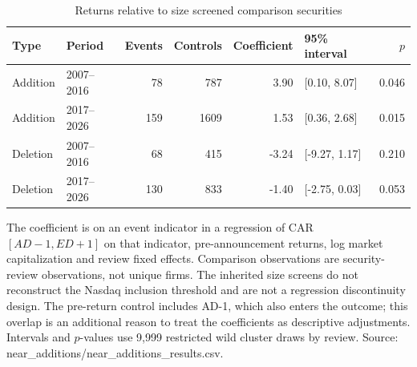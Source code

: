 \begin{table}[!htbp]
\centering
\caption{Returns relative to size screened comparison securities}\label{tab:comparators}
\small
\setlength{\tabcolsep}{5pt}
\begin{tabular}{llrrrlr}
\toprule
Type & Period & Events & Controls & Coefficient & 95\% interval & $p$ \\
\midrule
Addition & 2007--2016 & 78 & 787 & 3.90 & [0.10, 8.07] & 0.046 \\
Addition & 2017--2026 & 159 & 1609 & 1.53 & [0.36, 2.68] & 0.015 \\
Deletion & 2007--2016 & 68 & 415 & -3.24 & [-9.27, 1.17] & 0.210 \\
Deletion & 2017--2026 & 130 & 833 & -1.40 & [-2.75, 0.03] & 0.053 \\
\bottomrule
\end{tabular}
\begin{minipage}{\linewidth}\footnotesize\vspace{5pt}
The coefficient is on an event indicator in a regression of CAR $[AD-1,ED+1]$ on that indicator, pre-announcement returns, log market capitalization and review fixed effects. Comparison observations are security-review observations, not unique firms. The inherited size screens do not reconstruct the Nasdaq inclusion threshold and are not a regression discontinuity design. The pre-return control includes AD-1, which also enters the outcome; this overlap is an additional reason to treat the coefficients as descriptive adjustments. Intervals and $p$-values use 9,999 restricted wild cluster draws by review. Source: near\_additions/near\_additions\_results.csv.
\end{minipage}
\end{table}
